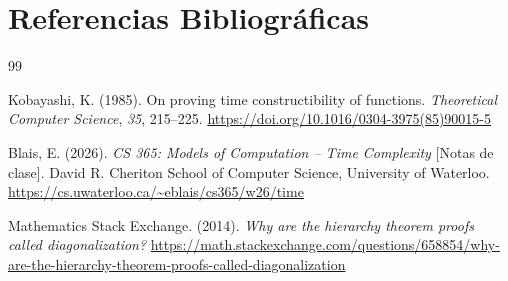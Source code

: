 \section{Referencias Bibliográficas}

\begin{thebibliography}{99}

Kobayashi, K. (1985). On proving time constructibility of functions. \textit{Theoretical Computer Science}, \textit{35}, 215--225. \url{https://doi.org/10.1016/0304-3975(85)90015-5}

Blais, E. (2026). \textit{CS 365: Models of Computation -- Time Complexity} [Notas de clase]. David R. Cheriton School of Computer Science, University of Waterloo. \url{https://cs.uwaterloo.ca/~eblais/cs365/w26/time}

Mathematics Stack Exchange. (2014). \textit{Why are the hierarchy theorem proofs called diagonalization?} \url{https://math.stackexchange.com/questions/658854/why-are-the-hierarchy-theorem-proofs-called-diagonalization}

\end{thebibliography}